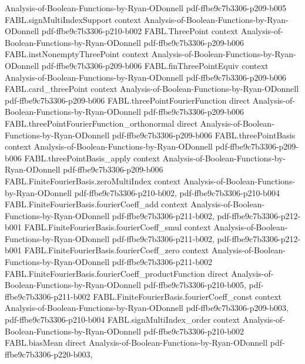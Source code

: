 \begin{theorem}
  {Analysis-of-Boolean-Functions-by-Ryan-ODonnell}
  {pdf-ffbe9c7b3306-p209-b005}
\proofstep
  {FABL.signMultiIndexSupport}
  {context}
  {Analysis-of-Boolean-Functions-by-Ryan-ODonnell}
  {pdf-ffbe9c7b3306-p210-b002}
\proofstep
  {FABL.ThreePoint}
  {context}
  {Analysis-of-Boolean-Functions-by-Ryan-ODonnell}
  {pdf-ffbe9c7b3306-p209-b006}
\proofstep
  {FABL.instNonemptyThreePoint}
  {context}
  {Analysis-of-Boolean-Functions-by-Ryan-ODonnell}
  {pdf-ffbe9c7b3306-p209-b006}
\proofstep
  {FABL.finThreePointEquiv}
  {context}
  {Analysis-of-Boolean-Functions-by-Ryan-ODonnell}
  {pdf-ffbe9c7b3306-p209-b006}
\proofstep
  {FABL.card_threePoint}
  {context}
  {Analysis-of-Boolean-Functions-by-Ryan-ODonnell}
  {pdf-ffbe9c7b3306-p209-b006}
\proofstep
  {FABL.threePointFourierFunction}
  {direct}
  {Analysis-of-Boolean-Functions-by-Ryan-ODonnell}
  {pdf-ffbe9c7b3306-p209-b006}
\proofstep
  {FABL.threePointFourierFunction_orthonormal}
  {direct}
  {Analysis-of-Boolean-Functions-by-Ryan-ODonnell}
  {pdf-ffbe9c7b3306-p209-b006}
\proofstep
  {FABL.threePointBasis}
  {context}
  {Analysis-of-Boolean-Functions-by-Ryan-ODonnell}
  {pdf-ffbe9c7b3306-p209-b006}
\proofstep
  {FABL.threePointBasis_apply}
  {context}
  {Analysis-of-Boolean-Functions-by-Ryan-ODonnell}
  {pdf-ffbe9c7b3306-p209-b006}
\proofstep
  {FABL.FiniteFourierBasis.zeroMultiIndex}
  {context}
  {Analysis-of-Boolean-Functions-by-Ryan-ODonnell}
  {pdf-ffbe9c7b3306-p210-b002,
    pdf-ffbe9c7b3306-p210-b004}
\proofstep
  {FABL.FiniteFourierBasis.fourierCoeff_add}
  {context}
  {Analysis-of-Boolean-Functions-by-Ryan-ODonnell}
  {pdf-ffbe9c7b3306-p211-b002,
    pdf-ffbe9c7b3306-p212-b001}
\proofstep
  {FABL.FiniteFourierBasis.fourierCoeff_smul}
  {context}
  {Analysis-of-Boolean-Functions-by-Ryan-ODonnell}
  {pdf-ffbe9c7b3306-p211-b002,
    pdf-ffbe9c7b3306-p212-b001}
\proofstep
  {FABL.FiniteFourierBasis.fourierCoeff_zero}
  {context}
  {Analysis-of-Boolean-Functions-by-Ryan-ODonnell}
  {pdf-ffbe9c7b3306-p211-b002}
\proofstep
  {FABL.FiniteFourierBasis.fourierCoeff_productFunction}
  {direct}
  {Analysis-of-Boolean-Functions-by-Ryan-ODonnell}
  {pdf-ffbe9c7b3306-p210-b005,
    pdf-ffbe9c7b3306-p211-b002}
\proofstep
  {FABL.FiniteFourierBasis.fourierCoeff_const}
  {context}
  {Analysis-of-Boolean-Functions-by-Ryan-ODonnell}
  {pdf-ffbe9c7b3306-p209-b003,
    pdf-ffbe9c7b3306-p210-b004}
\proofstep
  {FABL.signMultiIndex_order}
  {context}
  {Analysis-of-Boolean-Functions-by-Ryan-ODonnell}
  {pdf-ffbe9c7b3306-p210-b002}
\proofstep
  {FABL.biasMean}
  {direct}
  {Analysis-of-Boolean-Functions-by-Ryan-ODonnell}
  {pdf-ffbe9c7b3306-p220-b003,
}
\end{theorem}
